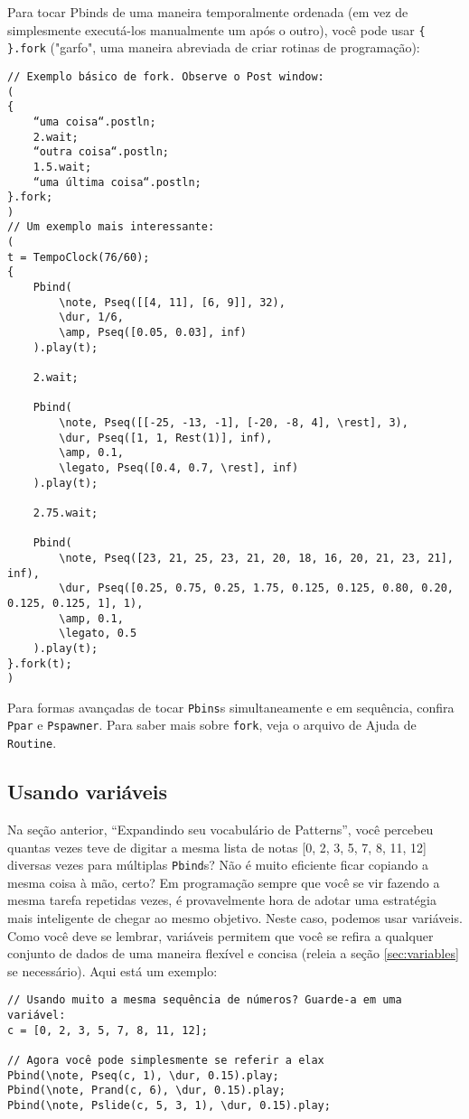 Para tocar Pbinds de uma maneira temporalmente ordenada (em vez de simplesmente executá-los manualmente um após o outro), você pode usar \texttt{\{ \}.fork} ("garfo", uma maneira abreviada de criar rotinas de programação):

\begin{lstlisting}[style=SuperCollider-IDE, basicstyle=\scttfamily\footnotesize]
// Exemplo básico de fork. Observe o Post window:
( 
{
	“uma coisa“.postln;
	2.wait;
	“outra coisa“.postln;
	1.5.wait;
	“uma última coisa“.postln;
}.fork;
)
// Um exemplo mais interessante:
(
t = TempoClock(76/60);
{
	Pbind(
		\note, Pseq([[4, 11], [6, 9]], 32),
		\dur, 1/6,
		\amp, Pseq([0.05, 0.03], inf)
	).play(t);
	
	2.wait;
	
	Pbind(
		\note, Pseq([[-25, -13, -1], [-20, -8, 4], \rest], 3),
		\dur, Pseq([1, 1, Rest(1)], inf),
		\amp, 0.1,
		\legato, Pseq([0.4, 0.7, \rest], inf)
	).play(t);

	2.75.wait;
	
	Pbind(
		\note, Pseq([23, 21, 25, 23, 21, 20, 18, 16, 20, 21, 23, 21], inf),
		\dur, Pseq([0.25, 0.75, 0.25, 1.75, 0.125, 0.125, 0.80, 0.20, 0.125, 0.125, 1], 1),
		\amp, 0.1,
		\legato, 0.5
	).play(t);
}.fork(t);
)
\end{lstlisting}
 
Para formas avançadas de tocar \texttt{Pbins}s simultaneamente e em sequência, confira \texttt{Ppar} e \texttt{Pspawner}. Para saber mais sobre \texttt{fork}, veja o arquivo de Ajuda de  \texttt{Routine}.

\subsection{Usando variáveis}

Na seção anterior, “Expandindo seu vocabulário de Patterns”, você percebeu quantas vezes teve de digitar a mesma lista de notas [0, 2, 3, 5, 7, 8, 11, 12] diversas vezes para múltiplas \texttt{Pbind}s? Não é muito eficiente ficar copiando a mesma coisa à mão, certo? Em programação sempre que você se vir fazendo a mesma tarefa repetidas vezes, é provavelmente hora de adotar uma estratégia mais inteligente de chegar ao mesmo objetivo. Neste caso, podemos usar variáveis. Como você deve se lembrar, variáveis permitem que você se refira a qualquer conjunto de dados de uma maneira flexível e concisa (releia a seção \ref{sec:variables} se necessário). Aqui está um exemplo:

\begin{lstlisting}[style=SuperCollider-IDE, basicstyle=\scttfamily\footnotesize]
// Usando muito a mesma sequência de números? Guarde-a em uma variável:
c = [0, 2, 3, 5, 7, 8, 11, 12];

// Agora você pode simplesmente se referir a elax
Pbind(\note, Pseq(c, 1), \dur, 0.15).play;
Pbind(\note, Prand(c, 6), \dur, 0.15).play;
Pbind(\note, Pslide(c, 5, 3, 1), \dur, 0.15).play;
\end{lstlisting}
 
